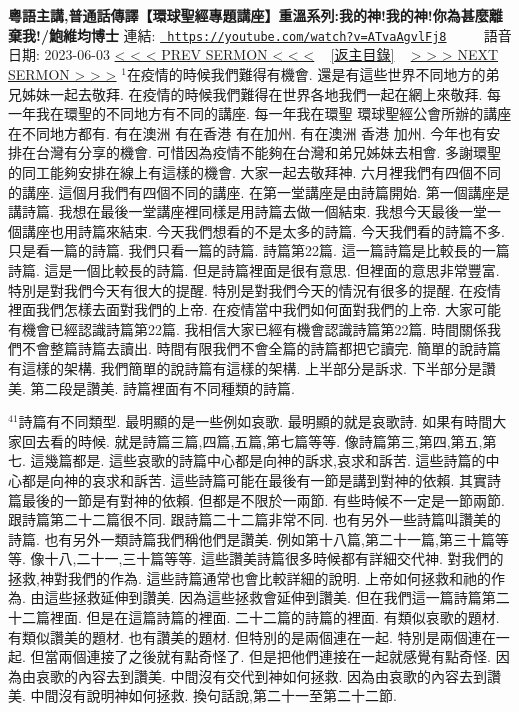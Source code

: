 \documentclass{book}
\begin{document}
\section{}
\label{sec:ATvaAgvlFj8}
\textbf{粵語主講,普通話傳譯【環球聖經專題講座】重溫系列:我的神!我的神!你為甚麼離棄我!/鮑維均博士}
\newline
\newline
連結: \href{https://youtube.com/watch?v=ATvaAgvlFj8}{\texttt{ https://youtube.com/watch?v=ATvaAgvlFj8}} ~~~~ 語音日期: 2023-06-03 
\newline
\newline
\hyperref[sec:o38R7JdB1AM]{\small{< < < PREV SERMON < < <}}
~
\hyperref[sec:index]{\small{[返主目錄]}}
~
\hyperref[sec:D_owA__iQKw]{\small{> > > NEXT SERMON > > >}}
\newline
\newline
$^{1}$在疫情的時候我們難得有機會.
還是有這些世界不同地方的弟兄姊妹一起去敬拜.
在疫情的時候我們難得在世界各地我們一起在網上來敬拜.
每一年我在環聖的不同地方有不同的講座.
每一年我在環聖 環球聖經公會所辦的講座在不同地方都有.
有在澳洲 有在香港 有在加州.
有在澳洲 香港 加州.
今年也有安排在台灣有分享的機會.
可惜因為疫情不能夠在台灣和弟兄姊妹去相會.
多謝環聖的同工能夠安排在線上有這樣的機會.
大家一起去敬拜神.
六月裡我們有四個不同的講座.
這個月我們有四個不同的講座.
在第一堂講座是由詩篇開始.
第一個講座是講詩篇.
我想在最後一堂講座裡同樣是用詩篇去做一個結束.
我想今天最後一堂一個講座也用詩篇來結束.
今天我們想看的不是太多的詩篇.
今天我們看的詩篇不多.
只是看一篇的詩篇.
我們只看一篇的詩篇.
詩篇第22篇.
這一篇詩篇是比較長的一篇詩篇.
這是一個比較長的詩篇.
但是詩篇裡面是很有意思.
但裡面的意思非常豐富.
特別是對我們今天有很大的提醒.
特別是對我們今天的情況有很多的提醒.
在疫情裡面我們怎樣去面對我們的上帝.
在疫情當中我們如何面對我們的上帝.
大家可能有機會已經認識詩篇第22篇.
我相信大家已經有機會認識詩篇第22篇.
時間關係我們不會整篇詩篇去讀出.
時間有限我們不會全篇的詩篇都把它讀完.
簡單的說詩篇有這樣的架構.
我們簡單的說詩篇有這樣的架構.
上半部分是訴求.
下半部分是讚美.
第二段是讚美.
詩篇裡面有不同種類的詩篇.

$^{41}$詩篇有不同類型.
最明顯的是一些例如哀歌.
最明顯的就是哀歌詩.
如果有時間大家回去看的時候.
就是詩篇三篇,四篇,五篇,第七篇等等.
像詩篇第三,第四,第五,第七.
這幾篇都是.
這些哀歌的詩篇中心都是向神的訴求,哀求和訴苦.
這些詩篇的中心都是向神的哀求和訴苦.
這些詩篇可能在最後有一節是講到對神的依賴.
其實詩篇最後的一節是有對神的依賴.
但都是不限於一兩節.
有些時候不一定是一節兩節.
跟詩篇第二十二篇很不同.
跟詩篇二十二篇非常不同.
也有另外一些詩篇叫讚美的詩篇.
也有另外一類詩篇我們稱他們是讚美.
例如第十八篇,第二十一篇,第三十篇等等.
像十八,二十一,三十篇等等.
這些讚美詩篇很多時候都有詳細交代神.
對我們的拯救,神對我們的作為.
這些詩篇通常也會比較詳細的說明.
上帝如何拯救和祂的作為.
由這些拯救延伸到讚美.
因為這些拯救會延伸到讚美.
但在我們這一篇詩篇第二十二篇裡面.
但是在這篇詩篇的裡面.
二十二篇的詩篇的裡面.
有類似哀歌的題材.
有類似讚美的題材.
也有讚美的題材.
但特別的是兩個連在一起.
特別是兩個連在一起.
但當兩個連接了之後就有點奇怪了.
但是把他們連接在一起就感覺有點奇怪.
因為由哀歌的內容去到讚美.
中間沒有交代到神如何拯救.
因為由哀歌的內容去到讚美.
中間沒有說明神如何拯救.
換句話說,第二十一至第二十二節.
\end{document}
